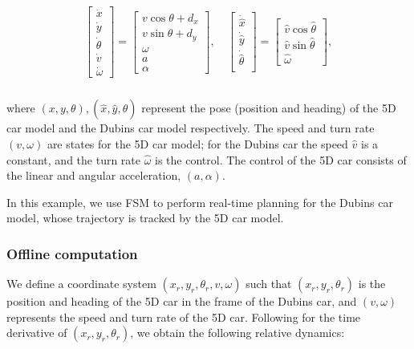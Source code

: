 \begin{equation}
\label{eq:5D_and_3D_dyn}
\begin{aligned}
\begin{array}{c}
\left[
\begin{array}{c}
\dot x\\
\dot y\\
\dot\theta\\
\dot v\\
\dot \omega
\end{array}
\right]
=
\left[
\begin{array}{c}
v \cos \theta + d_x\\
v \sin \theta + d_y\\
\omega \\
a\\
\alpha
\end{array}
\right], \quad
\left[
\begin{array}{c}
\dot {\hat x}\\
\dot {\hat y}\\
\dot {\hat \theta}\\
\end{array}
\right] 
=
\left[
\begin{array}{c}
\hat v \cos \hat\theta\\
\hat v \sin \hat\theta\\
\hat \omega
\end{array}
\right],
\end{array}\\
\end{aligned}
\end{equation}

\noindent where $(x,y,\theta),(\hat x, \hat y, \hat\theta)$ represent the pose (position and heading) of the 5D car model and the Dubins car model respectively. The speed and turn rate $(v, \omega)$ are states for the 5D car model; for the Dubins car the speed $\hat v$ is a constant, and the turn rate $\hat \omega$ is the control. The control of the 5D car consists of the linear and angular acceleration, $(a, \alpha)$.

In this example, we use FSM to perform real-time planning for the Dubins car model, whose trajectory is tracked by the 5D car model.

\subsubsection{Offline computation}

We define a coordinate system $(x_r, y_r, \theta_r, v, \omega)$ such that $(x_r, y_r, \theta_r)$ is the position and heading of the 5D car in the frame of the Dubins car, and $(v, \omega)$ represents the speed and turn rate of the 5D car. Following \cite{Mitchell05} for the time derivative of $(x_r, y_r, \theta_r)$, we obtain the following relative dynamics:

